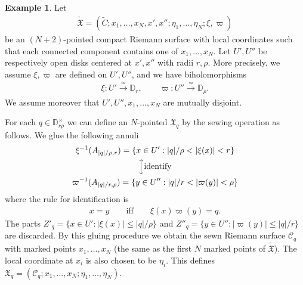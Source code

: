 \documentclass[11pt,b5paper,notitlepage]{article}
\theoremstyle{definition}
\newtheorem{eg}[df]{Example}
\theoremstyle{plain}
\newcommand{\fk}{\mathfrak}
\newcommand{\mc}{\mathcal}
\newcommand{\wtd}{\widetilde}
\newcommand{\Dbb}{\mathbb D}
\numberwithin{equation}{section}
\begin{document}
\subsection{}\label{lb170}


\begin{eg}\label{lb154}
Let
\begin{align*}
\wtd{\fk X}=(\wtd C;x_1,\dots,x_N,x',x'';\eta_1,\dots,\eta_N;\xi,\varpi)
\end{align*}
be an $(N+2)$-pointed compact Riemann surface with local coordinates such that each connected component contains one of $x_1,\dots,x_N$. Let $U',U''$ be respectively open  disks centered at $x',x''$ with radii $r,\rho$. More precisely, we assume $\xi,\varpi$ are defined on $U',U''$, and we have biholomorphisms
\begin{align*}
\xi:U'\xrightarrow{\simeq}\Dbb_r,\qquad \varpi:U''\xrightarrow{\simeq} \Dbb_\rho.
\end{align*}
We assume moreover that $U',U'',x_1,\dots,x_N$ are mutually disjoint.

For each $q\in\Dbb^\times_{r\rho}$ we can define an $N$-pointed $\fk X_q$ by the sewing operation as follows. We glue the following annuli
\begin{gather}
	\begin{gathered}
\xi^{-1}(A_{|q|/\rho,r})=\{x\in U': |q|/\rho<|\xi(x)|<r\}\\
\Big\updownarrow\text{identify}\\	
\varpi^{-1}(A_{|q|/r,\rho})=\{y\in U'':|q|/r<|\varpi(y)|<\rho\}
	\end{gathered}	
\end{gather}
where the rule for identification is
\begin{align}
x=y\qquad\text{iff}\qquad\xi(x)\varpi(y)=q.
\end{align}
The parts $Z'_q=\{x\in U':|\xi(x)|\leq |q|/\rho\}$ and $Z''_q=\{y\in U'':|\varpi(y)|\leq |q|/r\}$ are discarded. By this gluing procedure we obtain the sewn Riemann surface $\mc C_q$ with marked points $x_1,\dots,x_N$ (the same as the first $N$ marked points of $\wtd{\fk X}$). The local coordinate at $x_i$ is also chosen to be $\eta_i$. This defines $\fk X_q=(\mc C_q;x_1,\dots,x_N;\eta_1,\dots,\eta_N)$.


\end{eg}
\end{document}
